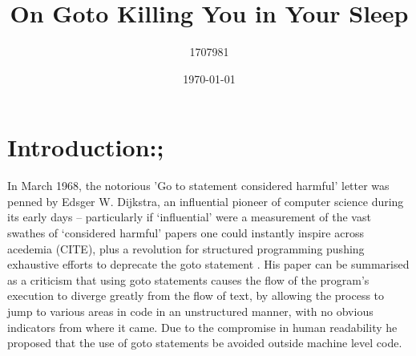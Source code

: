\documentclass{journal}
\title{On Goto Killing You in Your Sleep}
\author{1707981}
\date{\today}
\begin{document}
\maketitle




\section{\textunderscore \textunderscore Introduction:;}
In March 1968, the notorious 'Go to statement considered harmful' \cite{goto} letter was penned by Edsger W. Dijkstra, an influential pioneer of computer science during its early days -- particularly if `influential' were a measurement of the vast swathes of `considered harmful' papers one could instantly inspire across acedemia (CITE), plus a revolution for structured programming pushing exhaustive efforts to deprecate the goto statement \cite{revolution1, againstgoto}. His paper can be summarised as a criticism that using goto statements causes the flow of the program's execution to diverge greatly from the flow of text, by allowing the process to jump to various areas in code in an unstructured manner, with no obvious indicators from where it came. Due to the compromise in human readability he proposed that the use of goto statements be avoided outside machine level code.
\end{document}
